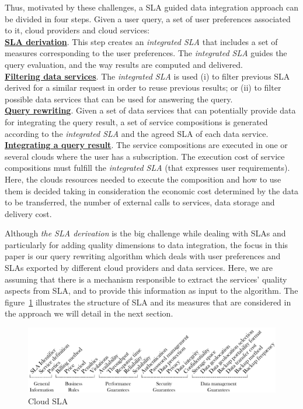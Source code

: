 Thus, motivated by these challenges, a SLA guided data integration approach can be divided in four steps. Given a user query, a set of user preferences associated to it, cloud providers and cloud services:
\\
\textbf{\underline{SLA derivation}}. This step creates an \textsl{integrated
SLA} that includes a set of measures corresponding to the user preferences. The \textsl{integrated SLA} guides the query evaluation, and the way results are computed and delivered. \\
\textbf{\underline{Filtering data services}}. The \textsl{integrated SLA} is used (i)
to filter previous SLA derived for a similar request in order to reuse previous results; or (ii) to filter possible data services that can be used for answering the query. \\
\textbf{\underline{Query rewriting}}. Given a set of data services that can
potentially provide data for integrating the query result, a set of service compositions is generated according to the \textsl{integrated SLA} and the agreed SLA of each data service. \\
\textbf{\underline{Integrating a query result}}. The service compositions are executed
in one or several clouds where the user has a subscription. The execution cost of service compositions must fulfill the \textsl{integrated SLA} (that expresses user requirements). Here, the clouds resources needed to execute the composition and how to use them is decided taking in consideration the economic cost determined by the data to be transferred, the number of external calls to services, data storage and delivery cost.

Although \textit{the SLA derivation} is the big challenge while dealing with
SLAs and particularly for adding quality dimensions to data integration, the
focus in this paper is our query rewriting algorithm which deals with user
preferences and SLAs exported by different cloud providers and data services.
Here, we are assuming that there is a mechanism responsible to extract the
services' quality aspects from SLA, and to provide this information as input to
the algorithm. The figure~\ref{fig:cloudsla} illustrates the structure of SLA
and its measures that are considered in the approach we will detail in the next
section.   

\begin{figure}[h!]
\center
\includegraphics[scale=0.57]{Cloud_SLA.pdf}
\caption{Cloud SLA}\label{fig:cloudsla}
\end{figure}